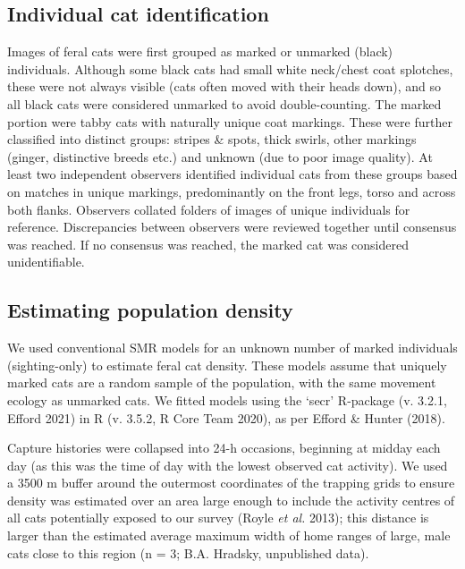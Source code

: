 \documentclass[11pt,a4paper,titlepage,twoside,openright]{style/unimelbthesis}
\begin{document}
\begin{mainmatter}
\hypertarget{individual-cat-identification}{%
\subsection{Individual cat identification}\label{individual-cat-identification}}

Images of feral cats were first grouped as marked or unmarked (black) individuals. Although some black cats had small white neck/chest coat splotches, these were not always visible (cats often moved with their heads down), and so all black cats were considered unmarked to avoid double-counting. The marked portion were tabby cats with naturally unique coat markings. These were further classified into distinct groups: stripes \& spots, thick swirls, other markings (ginger, distinctive breeds etc.) and unknown (due to poor image quality). At least two independent observers identified individual cats from these groups based on matches in unique markings, predominantly on the front legs, torso and across both flanks. Observers collated folders of images of unique individuals for reference. Discrepancies between observers were reviewed together until consensus was reached. If no consensus was reached, the marked cat was considered unidentifiable.

\hypertarget{estimating-population-density}{%
\subsection{Estimating population density}\label{estimating-population-density}}

We used conventional SMR models for an unknown number of marked individuals (sighting-only) to estimate feral cat density. These models assume that uniquely marked cats are a random sample of the population, with the same movement ecology as unmarked cats. We fitted models using the `secr' R-package (v. 3.2.1, Efford 2021) in R (v. 3.5.2, R Core Team 2020), as per Efford \& Hunter (2018).

Capture histories were collapsed into 24-h occasions, beginning at midday each day (as this was the time of day with the lowest observed cat activity). We used a 3500 m buffer around the outermost coordinates of the trapping grids to ensure density was estimated over an area large enough to include the activity centres of all cats potentially exposed to our survey (Royle \emph{et al.} 2013); this distance is larger than the estimated average maximum width of home ranges of large, male cats close to this region (n = 3; B.A. Hradsky, unpublished data).


\end{mainmatter}
\end{document}
